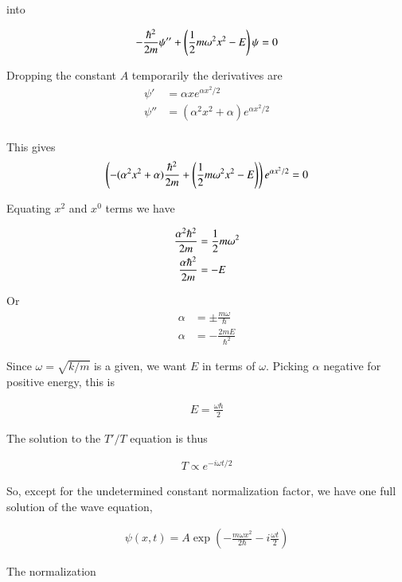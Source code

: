 into 

\begin{align*}
-\frac{\hbar^2}{2m} \psi'' + \left( \frac{1}{2}m \omega^2 x^2 - E \right) \psi = 0
\end{align*}

Dropping the constant $A$ temporarily the derivatives are
\begin{align*}
\psi' &= \alpha x e^{\alpha x^2/2} \\
\psi'' &= ( \alpha^2 x^2 + \alpha ) e^{\alpha x^2/2} \\
\end{align*}

This gives
\begin{align*}
\left( -( \alpha^2 x^2 + \alpha )\frac{\hbar^2}{2 m} + \left( \frac{1}{2}m \omega^2 x^2 - E \right) \right) e^{\alpha x^2/2} = 0
\end{align*}

Equating $x^2$ and $x^0$ terms we have

\begin{align*}
\frac{\alpha^2 \hbar^2}{2 m} &= \frac{1}{2}m \omega^2  \\
\frac{\alpha \hbar^2}{2 m} &= -E 
\end{align*}

Or
\begin{align*}
\alpha &= \pm \frac{ m \omega }{ \hbar }  \\
{\alpha } &= - \frac{2 m E }{\hbar^2}
\end{align*}

Since $\omega = \sqrt{k/m}$ is a given, we want $E$ in terms of $\omega$.  Picking $\alpha$ negative for positive energy, this is

\begin{align*}
E = \frac{ \omega \hbar }{ 2 } 
\end{align*}

The solution to the $T'/T$ equation is thus

\begin{align*}
T \propto e^{-i \omega t/2}
\end{align*}

So, except for the undetermined constant normalization factor, we have one full solution of the wave equation, 

\begin{align*}
\psi(x,t) = A \exp\left( - \frac{m \omega x^2 }{2 \hbar} - i \frac{\omega t}{2} \right)
\end{align*}

The normalization

